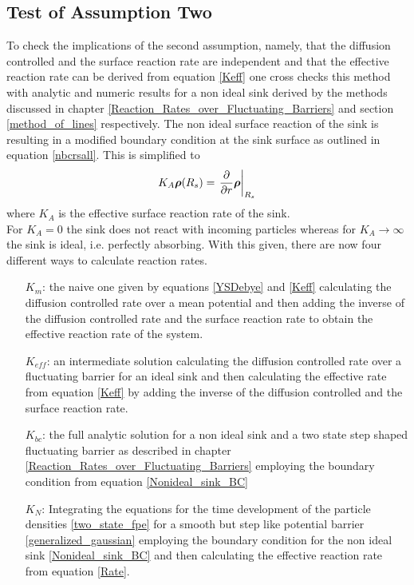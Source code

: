 \subsection{Test of Assumption Two}
\label{Assumption2}
To check the implications of the second assumption, namely, that the diffusion controlled and the surface reaction rate are independent and that the effective reaction rate can be derived from equation \eqref{Keff} one cross checks this method with analytic and numeric results for a non ideal sink derived by the methods discussed in chapter \ref{Reaction_Rates_over_Fluctuating_Barriers} and section \ref{method_of_lines} respectively. The non ideal surface reaction of the sink is resulting in a modified boundary condition at the sink surface as outlined in equation \eqref{nbcrsall}. This is simplified to
\begin{equation}
    K_A \boldsymbol{\mathbf{\rho}}(R_s) = \left. \frac{\partial}{\partial r} \boldsymbol{\mathbf{\rho}} \right|_{R_s}
    \label{Nonideal_sink_BC}
\end{equation}
where $K_A$ is the effective surface reaction rate of the sink.\\
For $K_A = 0$ the sink does not react with incoming particles whereas for $K_A \rightarrow \infty$ the sink is ideal, i.e. perfectly absorbing.
With this given, there are now four different ways to calculate reaction rates. 
\begin{itemize}
    \item[$K_m$:] the naive one given by equations \eqref{YSDebye} and \eqref{Keff} calculating the diffusion controlled rate over a mean potential and then adding the inverse of the diffusion controlled rate and the surface reaction rate to obtain the effective reaction rate of the system.
    \item[$K_{eff}$:] an intermediate solution calculating the diffusion controlled rate over a fluctuating barrier for an ideal sink and then calculating the effective rate from equation \eqref{Keff} by adding the inverse of the diffusion controlled and the surface reaction rate.
    \item[$K_{bc}$:] the full analytic solution for a non ideal sink and a two state step shaped fluctuating barrier as described in chapter \ref{Reaction_Rates_over_Fluctuating_Barriers} employing the boundary condition from equation \ref{Nonideal_sink_BC}
    \item[$K_N$:] Integrating the equations for the time development of the particle densities \eqref{two_state_fpe} for a smooth but step like potential barrier \eqref{generalized_gaussian} employing the boundary condition for the non ideal sink \eqref{Nonideal_sink_BC} and then calculating the effective reaction rate from equation \eqref{Rate}.
\end{itemize}
